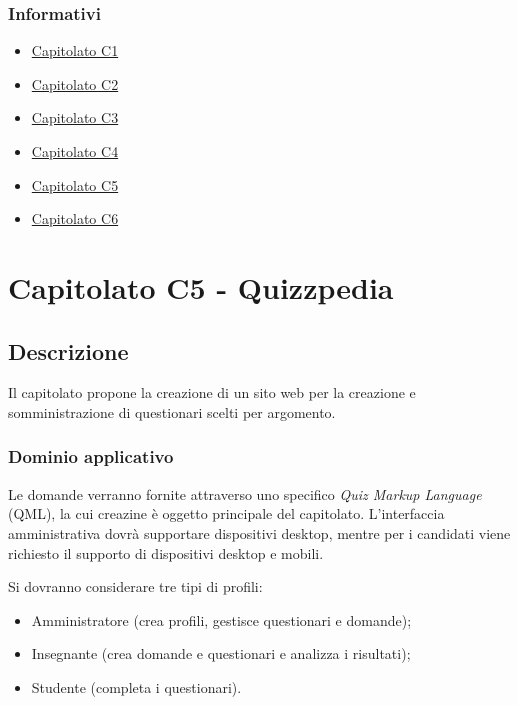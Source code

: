 \documentclass[12pt,a4paper]{article}
\begin{document}
\subsubsection{Informativi}

\begin{itemize}
\item \href{http://www.math.unipd.it/~tullio/IS-1/2015/Progetto/C1.pdf}{Capitolato C1}
\item \href{http://www.math.unipd.it/~tullio/IS-1/2015/Progetto/C2.pdf}{Capitolato C2}
\item \href{http://www.math.unipd.it/~tullio/IS-1/2015/Progetto/C3.pdf}{Capitolato C3}
\item \href{http://www.math.unipd.it/~tullio/IS-1/2015/Progetto/C4.pdf}{Capitolato C4}
\item \href{http://www.math.unipd.it/~tullio/IS-1/2015/Progetto/C5.pdf}{Capitolato C5}
\item \href{http://www.math.unipd.it/~tullio/IS-1/2015/Progetto/C6.pdf}{Capitolato C6}
\end{itemize}


\newpage
\section{Capitolato C5 - Quizzpedia}
\subsection{Descrizione}

Il capitolato propone la creazione di un sito web per la creazione e somministrazione di questionari scelti
per argomento.

\subsubsection{Dominio applicativo}

Le domande verranno fornite attraverso uno specifico \textit{Quiz Markup Language} (QML), la cui creazine
è oggetto principale del capitolato.
L'interfaccia amministrativa dovrà supportare dispositivi desktop, mentre per i candidati viene richiesto 
il supporto di dispositivi desktop e mobili.

Si dovranno considerare tre tipi di profili:

\begin{itemize}
\item Amministratore (crea profili, gestisce questionari e domande);
\item Insegnante (crea domande e questionari e analizza i risultati);
\item Studente (completa i questionari).
\end{itemize}
\end{document}
